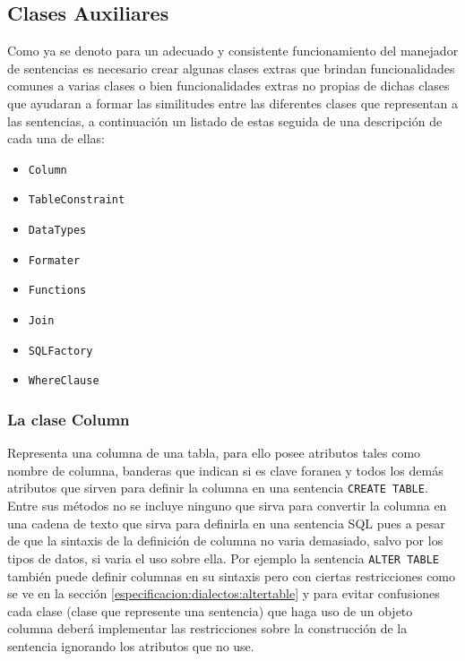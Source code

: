 \subsection{Clases Auxiliares} \label{seccion:disenio:clases-auxiliares}
Como ya se denoto para un adecuado y consistente funcionamiento del manejador de sentencias es necesario crear algunas clases extras que brindan funcionalidades comunes a varias clases o bien funcionalidades extras no propias de dichas clases que ayudaran a formar las similitudes entre las diferentes clases que representan a las sentencias, a continuación un listado de estas seguida de una descripción de cada una de ellas:
%
\begin{itemize}
\item \verb=Column=
\item \verb=TableConstraint=
\item \verb=DataTypes=
\item \verb=Formater=
\item \verb=Functions=
\item \verb=Join=
\item \verb=SQLFactory=
\item \verb=WhereClause=
\end{itemize}
%
\subsubsection{La clase Column}
Representa una columna de una tabla, para ello posee atributos tales como nombre de columna, banderas que indican si es clave foranea y todos los demás atributos que sirven para definir la columna en una sentencia \verb=CREATE TABLE=. Entre sus métodos no se incluye ninguno que sirva para convertir la columna en una cadena  de texto que sirva para definirla en una sentencia SQL pues a pesar de que la sintaxis de la definición de columna no varia demasiado, salvo por los tipos de datos, si varia el uso sobre ella. Por ejemplo la sentencia \verb=ALTER TABLE= también puede definir columnas en su sintaxis pero con ciertas restricciones como se ve en la sección \ref{especificacion:dialectos:altertable} y para evitar confusiones cada clase (clase que represente una sentencia) que haga uso de un objeto columna deberá implementar las restricciones sobre la construcción de la sentencia ignorando los atributos que no use.

